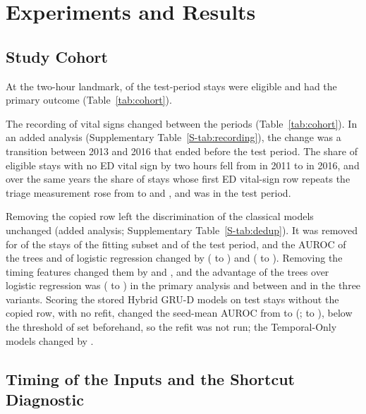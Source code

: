 \section{Experiments and Results}
\label{sec:results}

\subsection{Study Cohort}
\label{sec:results-cohort}

At the two-hour landmark, \RVHtwoTestEligible{} of the \RVHtwoTestStays{} test-period stays were eligible and \RVHtwoTestPositives{} had the primary outcome (Table~\ref{tab:cohort}).

The recording of vital signs changed between the periods (Table~\ref{tab:cohort}). In an added analysis (Supplementary Table~\ref{S-tab:recording}), the change was a transition between 2013 and 2016 that ended before the test period. The share of eligible stays with no ED vital sign by two hours fell from \RVRecZeroC{} in 2011 to \RVRecZeroH{} in 2016, and over the same years the share of stays whose first ED vital-sign row repeats the triage measurement rose from \RVRecEqTriC{} to \RVRecEqTriF{} and \RVRecEqTriH{}, and was \RVRecEqTriTest{} in the test period.

Removing the copied row left the discrimination of the classical models unchanged (added analysis; Supplementary Table~\ref{S-tab:dedup}). It was removed for \RVDdFlaggedFit{} of the stays of the fitting subset and \RVDdFlaggedTest{} of the test period, and the AUROC of the trees and of logistic regression changed by \RVDdTreesChange{} (\RVDdTreesChangeLo{} to \RVDdTreesChangeHi{}) and \RVDdLrChange{} (\RVDdLrChangeLo{} to \RVDdLrChangeHi{}). Removing the timing features changed them by \RVNtTreesChange{} and \RVNtLrChange{}, and the advantage of the trees over logistic regression was \RVOrigTreesOverLr{} (\RVOrigTreesOverLrLo{} to \RVOrigTreesOverLrHi{}) in the primary analysis and between \RVNtTreesOverLr{} and \RVVoTreesOverLr{} in the three variants. Scoring the stored Hybrid GRU-D models on test stays without the copied row, with no refit, changed the seed-mean AUROC from \RVGrudHybridStored{} to \RVGrudHybridDd{} (\RVGrudHybridChange{}; \RVGrudHybridChangeLo{} to \RVGrudHybridChangeHi{}), below the threshold of \RVGrudRule{} set beforehand, so the refit was not run; the Temporal-Only models changed by \RVGrudTempChange{}.

\subsection{Timing of the Inputs and the Shortcut Diagnostic}
\label{sec:results-audit}

